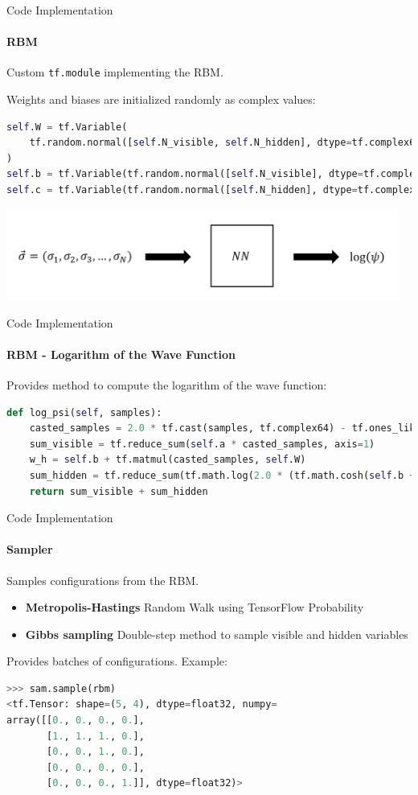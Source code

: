 \documentclass{beamer}
\begin{document}
\begin{frame}[fragile]{Code Implementation}
\framesubtitle{RBM}

Custom \lstinline[style=kaolstplain]|tf.module| implementing the RBM.
\baselineskip

Weights and biases are initialized randomly as complex values:
\begin{lstlisting}[language=Python, style=kaolstplain]
self.W = tf.Variable(
	tf.random.normal([self.N_visible, self.N_hidden], dtype=tf.complex64)
)
self.b = tf.Variable(tf.random.normal([self.N_visible], dtype=tf.complex64))
self.c = tf.Variable(tf.random.normal([self.N_hidden], dtype=tf.complex64))
\end{lstlisting}
\begin{center}
    \includegraphics[height=3cm]{images/rbm_usage.png}
\end{center}

\end{frame}

\begin{frame}[fragile]{Code Implementation}
\framesubtitle{RBM - Logarithm of the Wave Function}
Provides method to compute the logarithm of the wave function:
\begin{lstlisting}[language=Python, style=kaolstplain]
def log_psi(self, samples):
    casted_samples = 2.0 * tf.cast(samples, tf.complex64) - tf.ones_like(samples, dtype=tf.complex64)
    sum_visible = tf.reduce_sum(self.a * casted_samples, axis=1)
    w_h = self.b + tf.matmul(casted_samples, self.W)
    sum_hidden = tf.reduce_sum(tf.math.log(2.0 * (tf.math.cosh(self.b + tf.matmul(casted_samples, self.W)))), axis=1)
    return sum_visible + sum_hidden
\end{lstlisting}
\end{frame}


\begin{frame}[fragile]{Code Implementation}
\framesubtitle{Sampler}

Samples configurations from the RBM.

\begin{itemize}
    \item \textbf{Metropolis-Hastings} Random Walk using TensorFlow Probability
    \item \textbf{Gibbs sampling} Double-step method to sample visible and hidden variables
\end{itemize}

Provides batches of configurations. Example:
\begin{lstlisting}[language=Python, style=kaolstplain]
>>> sam.sample(rbm)
<tf.Tensor: shape=(5, 4), dtype=float32, numpy=
array([[0., 0., 0., 0.],
       [1., 1., 1., 0.],
       [0., 0., 1., 0.],
       [0., 0., 0., 0.],
       [0., 0., 0., 1.]], dtype=float32)>
\end{lstlisting}

\end{frame}
\end{document}
